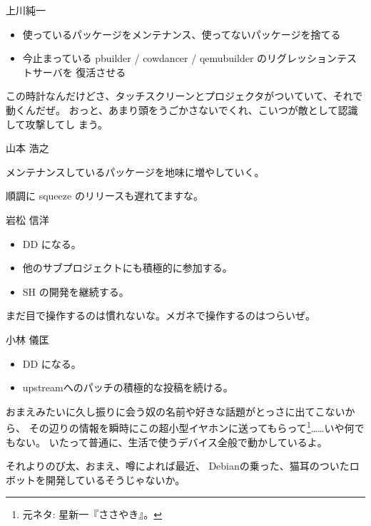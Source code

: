 
\begin{prework}{上川純一}

\begin{itemize}
 \item 使っているパッケージをメンテナンス、使ってないパッケージを捨てる
 \item 今止まっている pbuilder / cowdancer / qemubuilder のリグレッションテストサーバを
       復活させる
\end{itemize}


この時計なんだけどさ、タッチスクリーンとプロジェクタがついていて、それで
動くんだぜ。
おっと、あまり頭をうごかさないでくれ、こいつが敵として認識して攻撃してし
 まう。

\end{prework}

\begin{prework}{山本 浩之}

メンテナンスしているパッケージを地味に増やしていく。


順調に squeeze のリリースも遅れてますな。

\end{prework}


\begin{prework}{岩松 信洋}
\begin{itemize}
\item DD になる。
\item 他のサブプロジェクトにも積極的に参加する。
\item SH の開発を継続する。
\end{itemize}


まだ目で操作するのは慣れないな。メガネで操作するのはつらいぜ。

\end{prework}

\begin{prework}{小林 儀匡}
\begin{itemize}
\item DD になる。
\item upstreamへのパッチの積極的な投稿を続ける。
\end{itemize}


おまえみたいに久し振りに会う奴の名前や好きな話題がとっさに出てこないから、
その辺りの情報を瞬時にこの超小型イヤホンに送ってもらって\footnote{元ネタ: 星新一『ささやき』。}……いや何でもない。
いたって普通に、生活で使うデバイス全般で動かしているよ。

それよりのび太、おまえ、噂によれば最近、
Debianの乗った、猫耳のついたロボットを開発しているそうじゃないか。

\end{prework}

